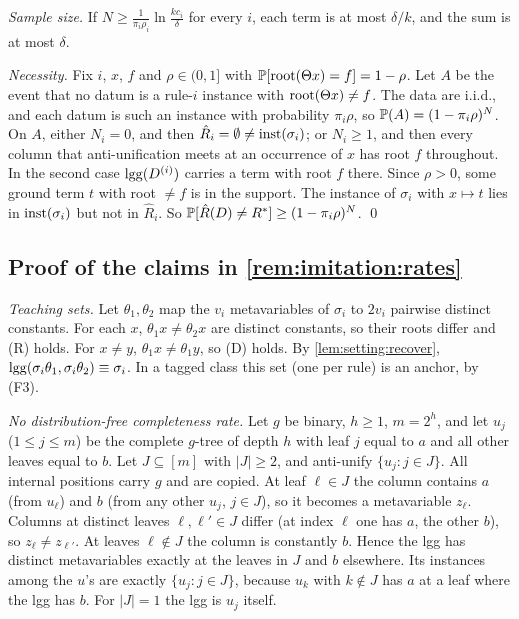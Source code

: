 \emph{Sample size.} If $N\ge\frac1{\pi_i\rho_i}\ln\frac{kc_i}\delta$ for every $i$, each term is at most $\delta/k$, and the sum is at most $\delta$.

\emph{Necessity.} Fix $i$, $x$, $f$ and $\rho\in(0,1]$ with $\mathbb{P}[\mathrm{root}(\Theta x)=f]=1-\rho$. Let $A$ be the event that no datum is a rule-$i$ instance with $\mathrm{root}(\Theta x)\neq f$. The data are i.i.d., and each datum is such an instance with probability $\pi_i\rho$, so $\mathbb{P}(A)=(1-\pi_i\rho)^N$. On $A$, either $N_i=0$, and then $\hat R_i=\emptyset\neq\mathrm{inst}(\sigma_i)$; or $N_i\ge1$, and then every column that anti-unification meets at an occurrence of $x$ has root $f$ throughout. In the second case $\mathrm{lgg}(D^{(i)})$ carries a term with root $f$ there. Since $\rho>0$, some ground term $t$ with root $\neq f$ is in the support. The instance of $\sigma_i$ with $x\mapsto t$ lies in $\mathrm{inst}(\sigma_i)$ but not in $\hat R_i$. So $\mathbb{P}[\hat R(D)\neq R^{*}]\ge(1-\pi_i\rho)^N$. \qed

\subsection{Proof of the claims in \texorpdfstring{\cref{rem:imitation:rates}}{the remark on rates}}\label{app:imitation:rates}

\emph{Teaching sets.} Let $\theta_1,\theta_2$ map the $v_i$ metavariables of $\sigma_i$ to $2v_i$ pairwise distinct constants. For each $x$, $\theta_1x\neq\theta_2x$ are distinct constants, so their roots differ and (R) holds. For $x\neq y$, $\theta_1x\neq\theta_1y$, so (D) holds. By \cref{lem:setting:recover}, $\mathrm{lgg}(\sigma_i\theta_1,\sigma_i\theta_2)\equiv\sigma_i$. In a tagged class this set (one per rule) is an anchor, by (F3).

\emph{No distribution-free completeness rate.} Let $g$ be binary, $h\ge1$, $m=2^h$, and let $u_j$ ($1\le j\le m$) be the complete $g$-tree of depth $h$ with leaf $j$ equal to $a$ and all other leaves equal to $b$. Let $J\subseteq[m]$ with $|J|\ge2$, and anti-unify $\{u_j:j\in J\}$. All internal positions carry $g$ and are copied. At leaf $\ell\in J$ the column contains $a$ (from $u_\ell$) and $b$ (from any other $u_j$, $j\in J$), so it becomes a metavariable $z_\ell$. Columns at distinct leaves $\ell,\ell'\in J$ differ (at index $\ell$ one has $a$, the other $b$), so $z_\ell\neq z_{\ell'}$. At leaves $\ell\notin J$ the column is constantly $b$. Hence the lgg has distinct metavariables exactly at the leaves in $J$ and $b$ elsewhere. Its instances among the $u$'s are exactly $\{u_j:j\in J\}$, because $u_k$ with $k\notin J$ has $a$ at a leaf where the lgg has $b$. For $|J|=1$ the lgg is $u_j$ itself.

